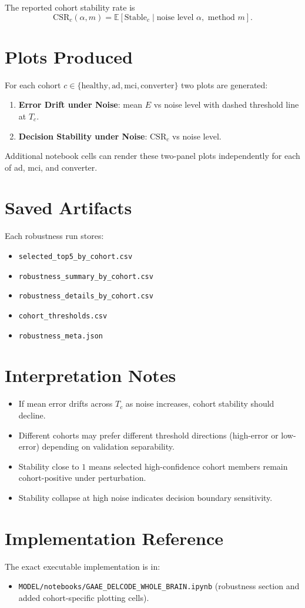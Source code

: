 \documentclass[11pt]{article}
\begin{document}
The reported cohort stability rate is
\begin{equation}
\mathrm{CSR}_c(\alpha,m)=\mathbb{E}[\mathrm{Stable}_c\mid \text{noise level }\alpha,\text{ method }m].
\end{equation}

\section*{Plots Produced}
For each cohort $c\in\{\text{healthy},\text{ad},\text{mci},\text{converter}\}$ two plots are generated:
\begin{enumerate}
\item \textbf{Error Drift under Noise}: mean $E$ vs noise level with dashed threshold line at $T_c$.
\item \textbf{Decision Stability under Noise}: $\mathrm{CSR}_c$ vs noise level.
\end{enumerate}

Additional notebook cells can render these two-panel plots independently for each of ad, mci, and converter.

\section*{Saved Artifacts}
Each robustness run stores:
\begin{itemize}
\item \texttt{selected\_top5\_by\_cohort.csv}
\item \texttt{robustness\_summary\_by\_cohort.csv}
\item \texttt{robustness\_details\_by\_cohort.csv}
\item \texttt{cohort\_thresholds.csv}
\item \texttt{robustness\_meta.json}
\end{itemize}

\section*{Interpretation Notes}
\begin{itemize}
\item If mean error drifts across $T_c$ as noise increases, cohort stability should decline.
\item Different cohorts may prefer different threshold directions (high-error or low-error) depending on validation separability.
\item Stability close to $1$ means selected high-confidence cohort members remain cohort-positive under perturbation.
\item Stability collapse at high noise indicates decision boundary sensitivity.
\end{itemize}

\section*{Implementation Reference}
The exact executable implementation is in:
\begin{itemize}
\item \texttt{MODEL/notebooks/GAAE\_DELCODE\_WHOLE\_BRAIN.ipynb} (robustness section and added cohort-specific plotting cells).
\end{itemize}
\end{document}
